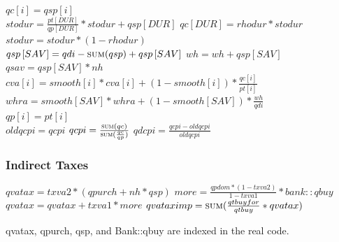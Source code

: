 \documentclass{article}
\begin{document}
\begin{algorithm}[H]
\caption{Household Update}
    \begin{algorithmic}
        \State \(qc\left[i\right] = qsp\left[i\right]\)
        \EndIf
        \EndFor
        \\
        \State \(stodur = \frac{pt\left[DUR\right]}{qp\left[DUR\right]} * stodur + qsp\left[DUR\right]\)
        \State \(qc\left[DUR\right] = rhodur * stodur\)
        \State \(stodur = stodur * (1 - rhodur)\)
        \\
        \State \(qsp\left[SAV\right] = qdi - \Call{sum}{qsp} + qsp\left[SAV\right]\)
        \State \(wh = wh + qsp\left[SAV\right]\)
        \State \(qsav = qsp\left[SAV\right] * nh\)
        \\
        \State \(cva\left[i\right] = smooth\left[i\right] * cva\left[i\right] + (1 - smooth\left[i\right]) * \frac{qc\left[i\right]}{pt\left[i\right]}\)
        \EndFor
        \\
        \State \(whra = smooth\left[SAV\right] * whra + (1 - smooth\left[SAV\right]) * \frac{wh}{qdi}\)
        \\
        \State \(qp\left[i\right] = pt\left[i\right]\)
        \EndFor
        \\
        \State \(oldqcpi = qcpi\)
        \State \(qcpi = \frac{\Call{sum}{qc}}{\Call{sum}{\frac{qc}{qp}}}\)
        \State \(qdcpi = \frac{qcpi - oldqcpi}{oldqcpi}\)
        \EndFunction
    \end{algorithmic}
\end{algorithm}

\subsubsection{Indirect Taxes}

\begin{algorithm}[H]
\caption{Indirect Taxes}
    \begin{algorithmic}
        \State \(qvatax = txva2 * (qpurch + nh * qsp)\)
        \State \(more = \frac{qpdom * (1 - txva2)}{1 - txva1} * bank::qbuy\)
        \State \(qvatax = qvatax + txva1 * more\)
        \EndIf
        \EndFor
        \State \(qvataximp = \Call{sum}{\frac{qtbuyfor}{qtbuy} * qvatax}\)
        \EndFunction
    \end{algorithmic}
    \small qvatax, qpurch, qsp, and Bank::qbuy are indexed in the real code.
\end{algorithm}
\end{document}
